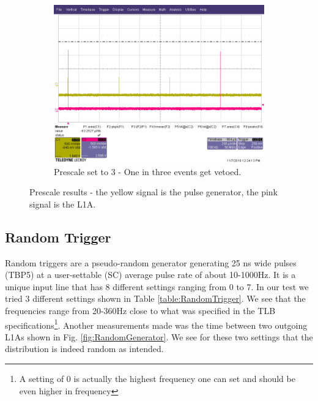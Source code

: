 \begin{figure}
    \begin{subfigure}[t]{.5\textwidth}
      \includegraphics[width=1.0\linewidth]{2kHzPrescale3.png}
      \caption{Prescale set to 3 - One in three events get vetoed.}
      \label{fig:2kHzPrescale3}
    \end{subfigure}
    \caption[Prescale results]{Prescale results - the yellow signal is the pulse generator, the pink signal is the L1A.}
    \label{fig:Prescales}
\end{figure}


\subsection{Random Trigger}
\label{Random Trigger}

Random triggers are a pseudo-random generator generating 25 ns wide pulses (TBP5) at a user-settable (SC) average pulse rate of about 10-1000Hz. It is a unique input line that has 8 different settings ranging from 0 to 7. In our test we tried 3 different settings shown in Table \ref{table:RandomTrigger}. We see that the frequencies range from 20-360Hz close to what was specified in the TLB specifications\footnote{A setting of 0 is actually the highest frequency one can set and should be even higher in frequency}. Another measurements made was the time between two outgoing L1As shown in Fig. \ref{fig:RandomGenerator}. We see for these two settings that the distribution is indeed random as intended.

